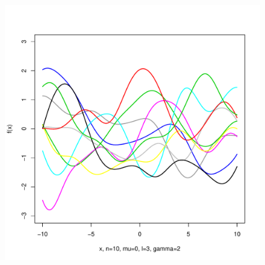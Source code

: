 \documentclass[12pt,letterpaper]{article}
\begin{document}
\begin{figure}
\begin{center}
\includegraphics[scale=0.2]{hw321/n10-m0-l3-g4.pdf}
\end{center}
\end{figure}
\end{document}
